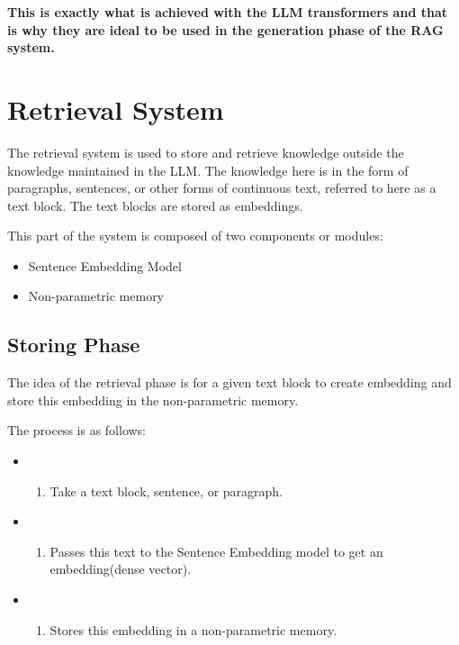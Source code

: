 \documentclass[11pt]{wseas}
\begin{document}
\textbf{This is exactly what is achieved with the LLM transformers and
that is why they are ideal to be used in the generation phase of the RAG
system.}

    \newpage

\section{Retrieval System}\label{retrieval-system}

The retrieval system is used to store and retrieve knowledge outside the
knowledge maintained in the LLM. The knowledge here is in the form of
paragraphs, sentences, or other forms of continuous text, referred to
here as a text block. The text blocks are stored as embeddings.

This part of the system is composed of two components or modules:

\begin{itemize}
\tightlist
\item
  Sentence Embedding Model
\item
  Non-parametric memory
\end{itemize}

\subsection{Storing Phase}\label{storing-phase}

The idea of the retrieval phase is for a given text block to create
embedding and store this embedding in the non-parametric memory.

The process is as follows:

\begin{itemize}
\tightlist
\item
  \begin{enumerate}
  \def\labelenumi{\arabic{enumi}.}
  \tightlist
  \item
    Take a text block, sentence, or paragraph.
  \end{enumerate}
\item
  \begin{enumerate}
  \def\labelenumi{\arabic{enumi}.}
  \setcounter{enumi}{1}
  \tightlist
  \item
    Passes this text to the Sentence Embedding model to get an
    embedding(dense vector).
  \end{enumerate}
\item
  \begin{enumerate}
  \def\labelenumi{\arabic{enumi}.}
  \setcounter{enumi}{2}
  \tightlist
  \item
    Stores this embedding in a non-parametric memory.
  \end{enumerate}
\end{itemize}
\end{document}
